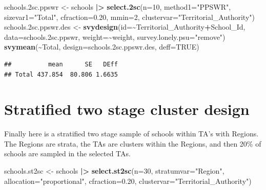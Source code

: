 \documentclass[
]{book}
\newenvironment{Shaded}{\begin{snugshade}}{\end{snugshade}}
\newcommand{\AttributeTok}[1]{\textcolor[rgb]{0.13,0.29,0.53}{#1}}
\newcommand{\ConstantTok}[1]{\textcolor[rgb]{0.56,0.35,0.01}{#1}}
\newcommand{\DecValTok}[1]{\textcolor[rgb]{0.00,0.00,0.81}{#1}}
\newcommand{\FloatTok}[1]{\textcolor[rgb]{0.00,0.00,0.81}{#1}}
\newcommand{\FunctionTok}[1]{\textcolor[rgb]{0.13,0.29,0.53}{\textbf{#1}}}
\newcommand{\NormalTok}[1]{#1}
\newcommand{\OtherTok}[1]{\textcolor[rgb]{0.56,0.35,0.01}{#1}}
\newcommand{\SpecialCharTok}[1]{\textcolor[rgb]{0.81,0.36,0.00}{\textbf{#1}}}
\newcommand{\StringTok}[1]{\textcolor[rgb]{0.31,0.60,0.02}{#1}}
\begin{document}
\begin{Shaded}
\begin{Highlighting}[]
\NormalTok{schools}\FloatTok{.2}\NormalTok{sc.ppswr }\OtherTok{\textless{}{-}}\NormalTok{ schools }\SpecialCharTok{|\textgreater{}} \FunctionTok{select.2sc}\NormalTok{(}\AttributeTok{n=}\DecValTok{10}\NormalTok{, }
                                           \AttributeTok{method1=}\StringTok{"PPSWR"}\NormalTok{, }\AttributeTok{sizevar1=}\StringTok{"Total"}\NormalTok{,}
                                           \AttributeTok{cfraction=}\FloatTok{0.20}\NormalTok{, }\AttributeTok{mmin=}\DecValTok{2}\NormalTok{, }
                                     \AttributeTok{clustervar=}\StringTok{"Territorial\_Authority"}\NormalTok{)}
\NormalTok{schools}\FloatTok{.2}\NormalTok{sc.ppswr.des }\OtherTok{\textless{}{-}} \FunctionTok{svydesign}\NormalTok{(}\AttributeTok{id=}\SpecialCharTok{\textasciitilde{}}\NormalTok{Territorial\_Authority}\SpecialCharTok{+}\NormalTok{School\_Id, }\AttributeTok{data=}\NormalTok{schools}\FloatTok{.2}\NormalTok{sc.ppswr, }
                                   \AttributeTok{weight=}\SpecialCharTok{\textasciitilde{}}\NormalTok{weight,}
                                   \AttributeTok{survey.lonely.psu=}\StringTok{"remove"}\NormalTok{)}
\FunctionTok{svymean}\NormalTok{(}\SpecialCharTok{\textasciitilde{}}\NormalTok{Total, }\AttributeTok{design=}\NormalTok{schools}\FloatTok{.2}\NormalTok{sc.ppswr.des, }\AttributeTok{deff=}\ConstantTok{TRUE}\NormalTok{)}
\end{Highlighting}
\end{Shaded}

\begin{verbatim}
##          mean      SE   DEff
## Total 437.854  80.806 1.6635
\end{verbatim}

\section{Stratified two stage cluster design}\label{stratified-two-stage-cluster-design}

Finally here is a stratified two stage sample of schools within TA's with Regions.
The Regions are strata, the TAs are clusters within the Regions, and then 20\% of
schools are sampled in the selected TAs.

\begin{Shaded}
\begin{Highlighting}[]
\NormalTok{schools.st2sc }\OtherTok{\textless{}{-}}\NormalTok{ schools }\SpecialCharTok{|\textgreater{}} \FunctionTok{select.st2sc}\NormalTok{(}\AttributeTok{n=}\DecValTok{30}\NormalTok{, }\AttributeTok{stratumvar=}\StringTok{"Region"}\NormalTok{, }\AttributeTok{allocation=}\StringTok{"proportional"}\NormalTok{,}
                                         \AttributeTok{cfraction=}\FloatTok{0.20}\NormalTok{, }\AttributeTok{clustervar=}\StringTok{"Territorial\_Authority"}\NormalTok{)}
\end{Highlighting}
\end{Shaded}
\end{document}
